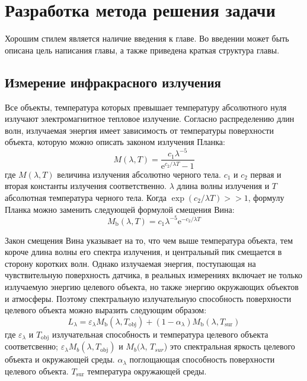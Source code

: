 \chapter{Разработка метода решения задачи} \label{ch3}


Хорошим стилем является наличие введения к главе. Во введении может быть описана цель написания главы, а также приведена краткая структура главы. 
	
\section{Измерение инфракрасного излучения} \label{ch3:sec1}

Все объекты, температура которых превышает температуру абсолютного нуля излучают электромагнитное тепловое излучение. Согласно распределению длин волн, излучаемая энергия имеет зависимость от температуры поверхности объекта, которую можно описать законом излучения Планка:
\begin{equation} 
M(\lambda, T)=\frac{c_1 \lambda^{-5}}{\mathrm{e}^{c_2 / \lambda T}-1}
\end{equation} 
где $M(\lambda, T)$ величина излучения абсолютно черного тела. $c_1$ и $c_2$ первая и вторая константы излучения соответственно. $\lambda$ длина волны излучения и $T$ абсолютная температура черного тела. Когда $\exp \left(c_2 / \lambda T\right)>>1$, формулу Планка можно заменить следующей формулой смещения Вина:
\begin{equation} 
M_{\mathrm{b}}(\lambda, T)=c_1 \lambda^{-5} \mathrm{e}^{-c_2 / \lambda T}
\end{equation} 

Закон смещения Вина указывает на то, что чем выше температура объекта, тем короче длина волны его спектра излучения, и центральный пик смещается в сторону коротких волн. Однако излучаемая энергия, поступающая на чувствительную поверхность датчика, в реальных измерениях включает не только излучаемую энергию целевого объекта, но также энергию окружающих объектов и атмосферы. Поэтому спектральную излучательную способность поверхности целевого объекта можно выразить следующим образом:
\begin{equation} 
L_\lambda=\varepsilon_\lambda M_{\mathrm{b}}\left(\lambda, T_{\mathrm{obj}}\right)+\left(1-\alpha_\lambda\right) M_{\mathrm{b}}\left(\lambda, T_{\mathrm{sur}}\right)
\end{equation} 
где $\varepsilon_\lambda$ и $T_{\mathrm{obj}}$ излучательная способность и температура целевого объекта соответсвенно; $\varepsilon_\lambda M_b\left(\lambda, T_{\mathrm{obj}}\right)$ и $M_b(\lambda$, $T_{sur}$) это спектральная яркость целевого объекта и окружающей среды. $\alpha_\lambda$ поглощающая способность поверхности целевого объекта. $T_{\mathrm{sur}}$ температура окружающей среды.

